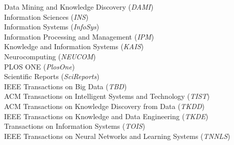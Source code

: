 \documentclass[10pt]{article}
\newenvironment{myindentpar}[1]%
{\begin{list}{}%
         {\setlength{\leftmargin}{#1}}%
         \item[]%
}
{\end{list}}
\newcounter{list}
\begin{document}
\begin{myindentpar}{0.75cm}
{\small

Data Mining and Knowledge Discovery (\textit{DAMI}) \\
Information Sciences (\textit{INS}) \\
Information Systems (\textit{InfoSys}) \\
Information Processing and Management (\textit{IPM}) \\
Knowledge and Information Systems (\textit{KAIS}) \\
Neurocomputing (\textit{NEUCOM}) \\
PLOS ONE (\textit{PlosOne}) \\
Scientific Reports (\textit{SciReports}) \\
IEEE Transactions on Big Data (\textit{TBD}) \\
ACM Transactions on Intelligent Systems and Technology (\textit{TIST}) \\
ACM Transactions on Knowledge Discovery from Data (\textit{TKDD}) \\
IEEE Transactions on Knowledge and Data Engineering (\textit{TKDE}) \\
Transactions on Information Systems (\textit{TOIS}) \\
IEEE Transactions on Neural Networks and Learning Systems (\textit{TNNLS})

}

\end{myindentpar}
\end{document}
